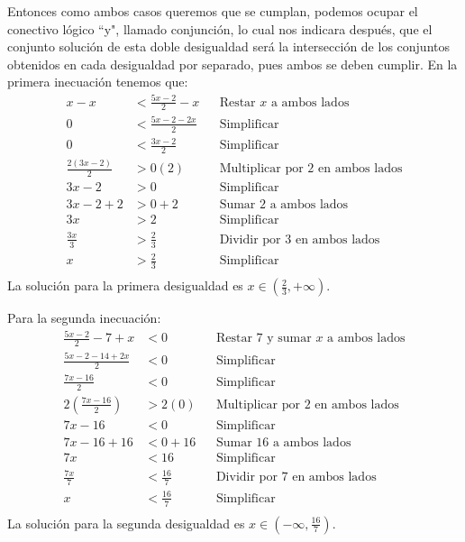 \documentclass{article}
\begin{document}
\begin{enumerate}
   Entonces como ambos casos queremos que se cumplan, podemos ocupar el conectivo lógico “y", llamado conjunción, lo cual nos indicara después, que el conjunto solución de esta doble desigualdad será la intersección de los conjuntos obtenidos en cada desigualdad por separado, pues ambos se deben cumplir. En la primera inecuación tenemos que:
   \begin{align*}
   x - x & < \frac{5x - 2}{2} - x && \text{Restar } x \text{ a ambos lados} \\
   0 & < \frac{5x - 2 - 2x}{2} && \text{Simplificar} \\
   0 & < \frac{3x - 2}{2} && \text{Simplificar} \\
   \frac{2(3x - 2)}{2} & > {0}(2) && \text{Multiplicar por } 2 \text{ en ambos lados} \\
   3x - 2 & > 0 && \text{Simplificar} \\
   3x - 2 + 2 & > 0 + 2 && \text{Sumar } 2 \text{ a ambos lados} \\
   3x & > 2 && \text{Simplificar} \\
   \frac{3x}{3} & > \frac{2}{3} && \text{Dividir por } 3 \text{ en ambos lados} \\
   x & > \frac{2}{3} && \text{Simplificar} \\
   \end{align*}
   La solución para la primera desigualdad es \(x \in \left(\frac{2}{3}, +\infty\right)\).
   
   Para la segunda inecuación:
   \begin{align*}
   \frac{5x - 2}{2} - 7 + x & < 0 && \text{Restar } 7 \text{ y sumar } x \text{ a ambos lados} \\
   \frac{5x - 2 - 14 + 2x}{2} & < 0 && \text{Simplificar} \\
   \frac{7x - 16}{2} & < 0 && \text{Simplificar} \\
   2\left(\frac{7x - 16}{2}\right) & > 2(0) && \text{Multiplicar por } 2 \text{ en ambos lados} \\
   7x - 16 & < 0 && \text{Simplificar} \\
   7x - 16 + 16 & < 0 + 16 && \text{Sumar } 16 \text{ a ambos lados} \\
   7x & < 16 && \text{Simplificar} \\
   \frac{7x}{7} & < \frac{16}{7} && \text{Dividir por } 7 \text{ en ambos lados} \\
   x & < \frac{16}{7} && \text{Simplificar} \\
   \end{align*}
   La solución para la segunda desigualdad es \(x \in \left(-\infty, \frac{16}{7}\right)\).
   

\end{enumerate}
\end{document}
